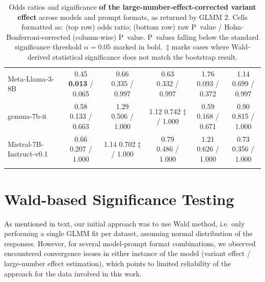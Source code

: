 \documentclass[11pt]{article}
\newcommand{\pbdesc}{P~values falling below the standard significance threshold $\alpha=0.05$ marked in bold.}
\newcommand{\ddagdesc}{$\ddagger$ marks cases where Wald-derived statistical significance does not match the bootstrap result.}
\begin{document}
\begin{table}[H]
\begin{tabular}{lccccc}
Meta-Llama-3-8B & \makecell{0.45 \\ \textbf{0.013} / 0.065} & \makecell{0.66 \\ 0.335 / 0.997} & \makecell{0.63 \\ 0.332 / 0.997} & \makecell{1.76 \\ 0.093 / 0.372} & \makecell{1.14 \\ 0.699 / 0.997} \\ \addlinespace
gemma-7b-it & \makecell{0.58 \\ 0.133 / 0.663} & \makecell{1.29 \\ 0.506 / 1.000} & \makecell{1.12 \\ 0.742 $\ddagger$ / 1.000} & \makecell{0.59 \\ 0.168 / 0.671} & \makecell{0.90 \\ 0.815 / 1.000} \\ \addlinespace
Mistral-7B-Instruct-v0.1 & \makecell{0.66 \\ 0.207 / 1.000} & \makecell{1.14 \\ 0.702 $\ddagger$ / 1.000} & \makecell{0.79 \\ 0.486 / 1.000} & \makecell{1.21 \\ 0.626 / 1.000} & \makecell{0.73 \\ 0.356 / 1.000} \\ \addlinespace
\bottomrule
\end{tabular}
\caption{Odds ratios and significance \textbf{of the large-number-effect-corrected variant effect} across models and prompt formats, as returned by GLMM 2. Cells formatted as: (top row) odds ratio; (bottom row) raw P~value / Holm-Bonferroni-corrected (column-wise) P~value. \pbdesc\ \ddagdesc}
\label{tab:corrected_delta_symb_odds}
\end{table}

\newpage

\section{Wald-based Significance Testing}\label{apx:degenerate-fit}
As mentioned in text, our initial approach was to use Wald method, i.e. only performing a single GLMM fit per dataset, assuming normal distribution of the responses. However, for several model-prompt format combinations, we observed encountered convergence issues in either instance of the model (variant effect / large-number effect estimation), which points to limited reliability of the approach for the data involved in this work.
\end{document}
